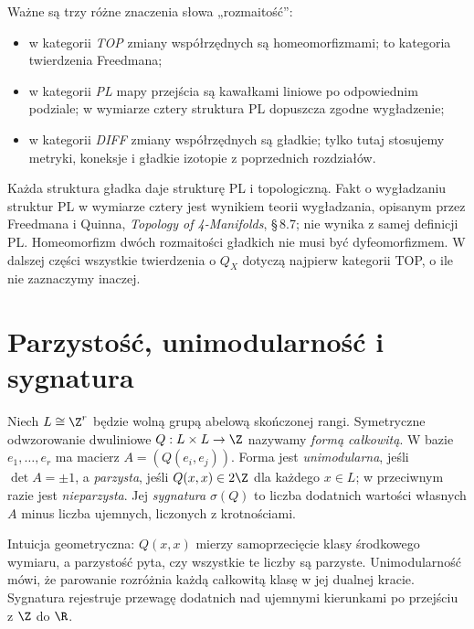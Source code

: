 Ważne są trzy różne znaczenia słowa „rozmaitość”:
\begin{itemize}[leftmargin=2em]
\item w kategorii \emph{TOP} zmiany współrzędnych są
homeomorfizmami; to kategoria twierdzenia Freedmana;
\item w kategorii \emph{PL} mapy przejścia są kawałkami
liniowe po odpowiednim podziale; w wymiarze cztery
struktura PL dopuszcza zgodne wygładzenie;
\item w kategorii \emph{DIFF} zmiany współrzędnych są
gładkie; tylko tutaj stosujemy metryki, koneksje i
gładkie izotopie z poprzednich rozdziałów.
\end{itemize}
Każda struktura gładka daje strukturę PL i topologiczną.
Fakt o wygładzaniu struktur PL w wymiarze cztery jest
wynikiem teorii wygładzania, opisanym przez
Freedmana i Quinna, \emph{Topology of 4-Manifolds},
\S\,8.7; nie wynika z samej definicji PL.
Homeomorfizm dwóch rozmaitości gładkich nie musi być
dyfeomorfizmem. W dalszej części wszystkie twierdzenia
o $Q_X$ dotyczą najpierw kategorii TOP, o ile nie
zaznaczymy inaczej.

\section{Parzystość, unimodularność i sygnatura}
\label{sec:freedman-lattices}

\begin{definicja}
\label{def:freedman-integral-form}
Niech $L\cong\Z^r$ będzie wolną grupą abelową skończonej
rangi. Symetryczne odwzorowanie dwuliniowe
$Q:L\times L\to\Z$ nazywamy \emph{formą całkowitą}.
W bazie $e_1,\ldots,e_r$ ma macierz
$A=(Q(e_i,e_j))$. Forma jest \emph{unimodularna},
jeśli $\det A=\pm1$, a \emph{parzysta}, jeśli
$Q(x,x)\in2\Z$ dla każdego $x\in L$;
w przeciwnym razie jest \emph{nieparzysta}.
Jej \emph{sygnatura} $\sigma(Q)$ to liczba dodatnich
wartości własnych $A$ minus liczba ujemnych, liczonych
z krotnościami.
\end{definicja}

Intuicja geometryczna: $Q(x,x)$ mierzy samoprzecięcie
klasy środkowego wymiaru, a parzystość pyta, czy
wszystkie te liczby są parzyste. Unimodularność mówi,
że parowanie rozróżnia każdą całkowitą klasę w jej
dualnej kracie. Sygnatura rejestruje przewagę dodatnich
nad ujemnymi kierunkami po przejściu z $\Z$ do $\R$.

